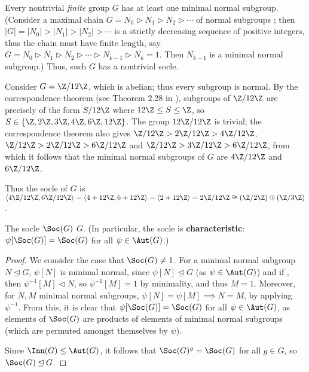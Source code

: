 Every nontrivial \textit{finite} group $G$ has at least one minimal normal subgroup. (Consider a maximal chain $G = N_0 \rhd N_1 \rhd N_2 \rhd \dotsb$ of normal subgroups ; then $|G| = |N_0| > |N_1| > |N_2| > \dotsb$ is a strictly decreasing sequence of positive integers, thus the chain must have finite length, say $G = N_0 \rhd N_1 \rhd N_2 \rhd \dotsb \rhd N_{k-1} \rhd N_k = 1$. Then $N_{k-1}$ is a minimal normal subgroup.) Thus, such $G$ has a nontrivial socle. 

\begin{example}\label{eg:socle_Z_12}
    Consider $G = \Z/12\Z$, which is abelian; thus every subgroup is normal. By the correspondence theorem (see Theorem 2.28 in \cite{rotman_intro_theory_groups1995}), subgroups of $\Z/12\Z$ are precisely of the form $S/12\Z$ where $12\Z \leq S \leq \Z$, so $S \in \{\Z,2\Z,3\Z,4\Z,6\Z,12\Z\}$. The group $12\Z/12\Z$ is trivial; the correspondence theorem also gives $\Z/12\Z > 2\Z/12\Z > 4\Z/12\Z$, $\Z/12\Z > 2\Z/12\Z > 6\Z/12\Z$ and $\Z/12\Z > 3\Z/12\Z > 6\Z/12\Z$, from which it follows that the minimal normal subgroups of $G$ are $4\Z/12\Z$ and $6\Z/12\Z$.

    Thus the socle of $G$ is $\langle 4\Z/12\Z,6\Z/12\Z \rangle = \langle 4 + 12\Z,6 + 12\Z \rangle = \langle 2 + 12\Z \rangle = 2\Z/12\Z \cong (\Z/2\Z) \oplus (\Z/3\Z)$.
\end{example}

\begin{lemma}\label{lem:socle_is_normal}
    The socle $\Soc(G)$  $G$. (In particular, the socle is \textbf{characteristic}: $\psi[\Soc(G)] = \Soc(G)$ for all $\psi \in \Aut(G)$.)
\end{lemma}

\begin{proof}
    We consider the case that $\Soc(G) \neq 1$. For a minimal normal subgroup $N \unlhd G$, $\psi[N]$ is minimal normal, since $\psi[N] \unlhd G$ (as $\psi \in \Aut(G)$) and if , then $\psi^{-1}[M] \lhd N$, so $\psi^{-1}[M] = 1$ by minimality, and thus $M = 1$. Moreover, for $N,M$ minimal normal subgroups, $\psi[N] = \psi[M] \implies N = M$, by applying $\psi^{-1}$. From this, it is clear that $\psi[\Soc(G)] = \Soc(G)$ for all $\psi \in \Aut(G)$, as elements of $\Soc(G)$ are products of elements of minimal normal subgroups (which are permuted amongst themselves by $\psi$).

    Since $\Inn(G) \leq \Aut(G)$, it follows that $\Soc(G)^g = \Soc(G)$ for all $g \in G$, so $\Soc(G) \unlhd G$.
\end{proof}

